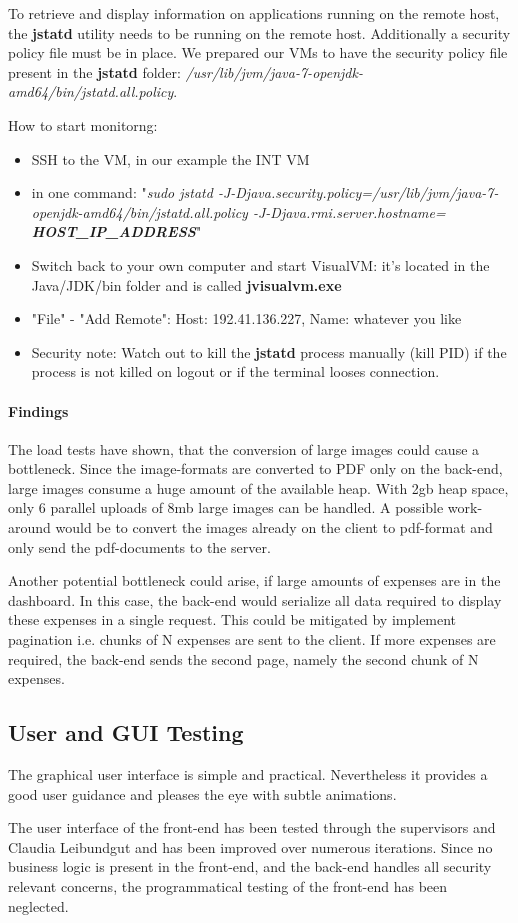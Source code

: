To retrieve and display information on applications running on the remote host, the \textbf{jstatd} utility needs to be running on the remote host. Additionally a security policy file must be in place. We prepared our VMs to have the security policy file present in the \textbf{jstatd} folder:  \textit{/usr/lib/jvm/java-7-openjdk-amd64/bin/jstatd.all.policy}.\par

How to start monitorng:
\begin{itemize}
	\item SSH to the VM, in our example the INT VM
	\item in one command: "\textit{sudo jstatd -J-Djava.security.policy=/usr/lib/jvm/java-7-openjdk-amd64/bin/jstatd.all.policy -J-Djava.rmi.server.hostname= \textbf{HOST\_IP\_ADDRESS}}"
	\item Switch back to your own computer and start VisualVM: it’s located in the Java/JDK/bin folder and is called \textbf{jvisualvm.exe}
	\item "File" - "Add Remote": Host: 192.41.136.227, Name: whatever you like
	\item Security note: Watch out to kill the \textbf{jstatd} process manually (kill PID) if the process is not killed on logout or if the terminal looses connection.
\end{itemize}

\paragraph{Findings}
The load tests have shown, that the conversion of large images could cause a bottleneck. Since the image-formats are converted to PDF only on the back-end, large images consume a huge amount of the available heap. With 2gb heap space, only 6 parallel uploads of 8mb large images can be handled. A possible work-around would be to convert the images already on the client to pdf-format and only send the pdf-documents to the server.\par

Another potential bottleneck could arise, if large amounts of expenses are in the dashboard. In this case, the back-end would serialize all data required to display these expenses in a single request. This could be mitigated by implement pagination i.e. chunks of N expenses are sent to the client. If more expenses are required, the back-end sends the second page, namely the second chunk of N expenses.

\subsection{User and GUI Testing}
The graphical user interface is simple and practical. Nevertheless it provides a good user guidance and pleases the eye with subtle animations.\par

The user interface of the front-end has been tested through the supervisors and Claudia Leibundgut and has been improved over numerous iterations. Since no business logic is present in the front-end, and the back-end handles all security relevant concerns, the programmatical testing of the front-end has been neglected.
